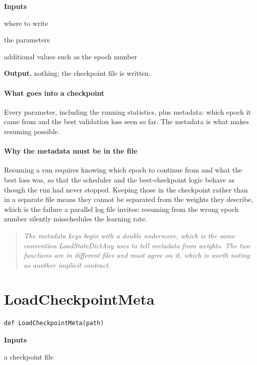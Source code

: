 \noindent\textbf{Inputs}
\begin{description}[leftmargin=2.2em,style=nextline,font=\normalfont\ttfamily]\setlength\itemsep{1pt}
  \item[{path}] \normalfont where to write
  \item[{params}] \normalfont the parameters
  \item[{extra}] \normalfont additional values such as the epoch number
\end{description}

\noindent\textbf{Output.} nothing; the checkpoint file is written.


\paragraph{What goes into a checkpoint}
Every parameter, including the running statistics, plus metadata: which epoch it came from and the best validation loss seen so far. The metadata is what makes resuming possible.


\paragraph{Why the metadata must be in the file}
Resuming a run requires knowing which epoch to continue from and what the best loss was, so that the scheduler and the best-checkpoint logic behave as though the run had never stopped. Keeping those in the checkpoint rather than in a separate file means they cannot be separated from the weights they describe, which is the failure a parallel log file invites: resuming from the wrong epoch number silently misschedules the learning rate.


\begin{quote}\small\itshape The metadata keys begin with a double underscore, which is the same convention LoadStateDictAny uses to tell metadata from weights. The two functions are in different files and must agree on it, which is worth noting as another implicit contract.\end{quote}

\section{LoadCheckpointMeta}
\begin{lstlisting}[style=sig]
def LoadCheckpointMeta(path)
\end{lstlisting}

\noindent\textbf{Inputs}
\begin{description}[leftmargin=2.2em,style=nextline,font=\normalfont\ttfamily]\setlength\itemsep{1pt}
  \item[{path}] \normalfont a checkpoint file
\end{description}

